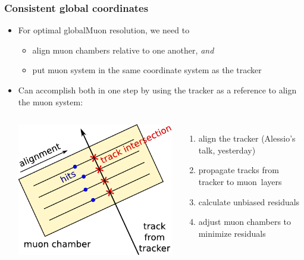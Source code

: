 \documentclass[compress]{beamer}
\begin{document}
\begin{frame}
\frametitle{Consistent global coordinates}
\begin{itemize}\setlength{\itemsep}{0.1 cm}
\item For optimal globalMuon resolution, we need to
\begin{itemize}
\item align muon chambers relative to one another, {\it and}
\item put muon system in the same coordinate system as the tracker
\end{itemize}
\item Can accomplish both in one step by using the tracker as a
  reference to align the muon system:

\vspace{0.3 cm}
\begin{columns}
\includegraphics[width=\linewidth]{hip_explanation.pdf}

\begin{enumerate}
\item align the tracker (Alessio's talk, yesterday)
\item propagate tracks from tracker to \mbox{muon layers\hspace{-1 cm}}
\item calculate unbiased residuals
\item adjust muon chambers to minimize \mbox{residuals\hspace{-1 cm}}
\end{enumerate}
\vspace{0.3 cm}
\end{columns}


\end{itemize}
\end{frame}
\end{document}

